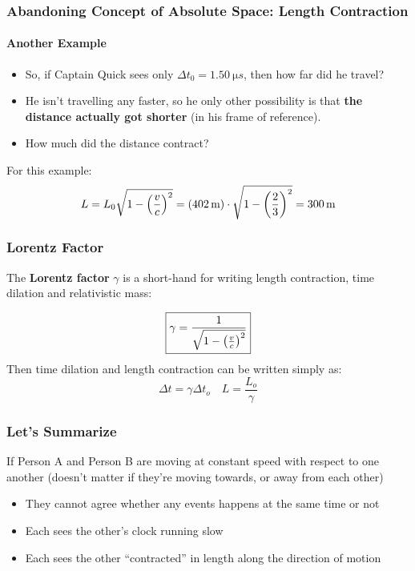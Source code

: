 \documentclass[12pt,compress,aspectratio=169]{beamer}
\newcommand{\bigsqrt}{\ensuremath\sqrt{1-\left(\frac{v}{c}\right)^2}}
\newcommand{\lorentz}{\ensuremath\frac{1}{\bigsqrt}}
\begin{document}
\begin{frame}
  \frametitle{Abandoning Concept of Absolute Space: Length Contraction}
  \framesubtitle{Another Example}
  \begin{itemize}
  \item So, if Captain Quick sees only $\Delta t_0=\SI{1.50}{\micro s}$, then
    how far did he travel?
  \item He isn't travelling any faster, so he only other possibility is that
    \textbf{the distance actually got shorter} (in his frame of reference).
  \item How much did the distance contract?
  \end{itemize}
  
  \vspace{-.3in}{\LARGE
    \begin{displaymath}
      \boxed{L=L_0\bigsqrt}
    \end{displaymath}
  }

  For this example:
  \begin{displaymath}
    L=L_0\bigsqrt=(\SI{402}{m})\cdot\sqrt{1-\left(\frac{2}{3}\right)^2}
    =\SI{300}{m}
  \end{displaymath}
\end{frame}

\begin{frame}
  \frametitle{Lorentz Factor}
  The \textbf{Lorentz factor} $\gamma$ is a short-hand for writing length
  contraction, time dilation and relativistic mass:

  \vspace{-0.2in}
  {\LARGE
    \begin{displaymath}
      \boxed{\gamma=\lorentz}
    \end{displaymath}
  }
  Then time dilation and length contraction can be written simply as:
  {\LARGE
    \begin{displaymath}
      \boxed{\Delta t = \gamma \Delta t_o}\quad\boxed{L = \frac{L_o}{\gamma}}
    \end{displaymath}
  }
\end{frame}

\begin{frame}
  \frametitle{Let's Summarize}
  \begin{center}
  \end{center}
  If Person A and Person B are moving at constant speed with respect to one 
  another (doesn't matter if they're moving towards, or away from each other)
  \begin{itemize}
  \item They cannot agree whether any events happens at the same time or not
  \item Each sees the other's clock running slow
  \item Each sees the other ``contracted'' in length along the direction of
    motion
  \end{itemize}
\end{frame}
\end{document}
